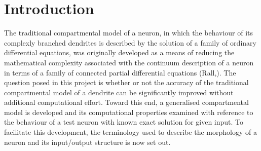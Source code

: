 \section{Introduction}
The traditional compartmental model of a neuron, in which the
behaviour of its complexly branched dendrites is described by the
solution of a family of ordinary differential equations, was
originally developed as a means of reducing the mathematical
complexity associated with the continuum description of a neuron
in terms of a family of connected partial differential equations
(Rall,\cite{Rall64}). The question posed in this project is
whether or not the accuracy of the traditional compartmental model
of a dendrite can be significantly improved without additional
computational effort. Toward this end, a generalised compartmental
model is developed and its computational properties examined with
reference to the behaviour of a test neuron with known exact
solution for given input. To facilitate this development, the
terminology used to describe the morphology of a neuron and its
input/output structure is now set out.

